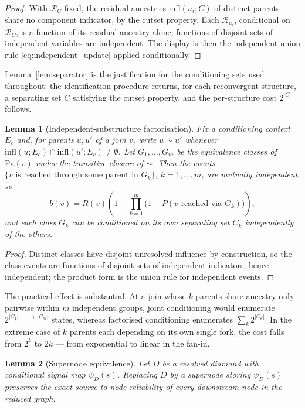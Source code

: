 \documentclass[preprint,12pt]{elsarticle}
\newtheorem{lemma}{Lemma}
\theoremstyle{definition}
\begin{document}
\begin{proof}
With $\mathcal{R}_C$ fixed, the residual ancestries $\mathrm{infl}(u_i;C)$ of distinct parents share no
component indicator, by the cutset property. Each $\mathcal{R}_{u_i}$, conditional on $\mathcal{R}_C$,
is a function of its residual ancestry alone; functions of disjoint sets of independent variables are
independent. The display is then the independent-union rule \eqref{eq:independent_update} applied
conditionally.
\end{proof}

Lemma~\ref{lem:separator} is the justification for the conditioning sets used throughout: the
identification procedure returns, for each reconvergent structure, a separating set $C$ satisfying the
cutset property, and the per-structure cost $2^{|C|}$ follows.

\begin{lemma}[Independent-substructure factorisation]\label{lem:factorisation}
Fix a conditioning context $E_c$ and, for parents $u,u'$ of a join $v$, write $u\sim u'$ whenever
$\mathrm{infl}(u;E_c)\cap\mathrm{infl}(u';E_c)\neq\emptyset$. Let $G_1,\dots,G_m$ be the equivalence
classes of $\mathrm{Pa}(v)$ under the transitive closure of $\sim$. Then the events
$\{v \text{ is reached through some parent in } G_k\}$, $k=1,\dots,m$, are mutually independent, so
\begin{equation}
b(v)=R(v)\left(1-\prod_{k=1}^{m}\bigl(1-P(v \text{ reached via } G_k)\bigr)\right),
\end{equation}
and each class $G_k$ can be conditioned on its own separating set $C_k$ independently of the others.
\end{lemma}

\begin{proof}
Distinct classes have disjoint unresolved influence by construction, so the class events are functions of
disjoint sets of independent indicators, hence independent; the product form is the union rule for
independent events.
\end{proof}

The practical effect is substantial. At a join whose $k$ parents share ancestry only pairwise within $m$
independent groups, joint conditioning would enumerate $2^{|C_1|+\cdots+|C_m|}$ states, whereas
factorised conditioning enumerates $\sum_k 2^{|C_k|}$. In the extreme case of $k$ parents each depending
on its own single fork, the cost falls from $2^k$ to $2k$ --- from exponential to linear in the fan-in.

\begin{lemma}[Supernode equivalence]\label{lem:supernode}
Let $D$ be a resolved diamond with conditional signal map $\psi_D(s)$. Replacing $D$ by a supernode
storing $\psi_D(s)$ preserves the exact source-to-node reliability of every downstream node in the
reduced graph.
\end{lemma}
\end{document}
